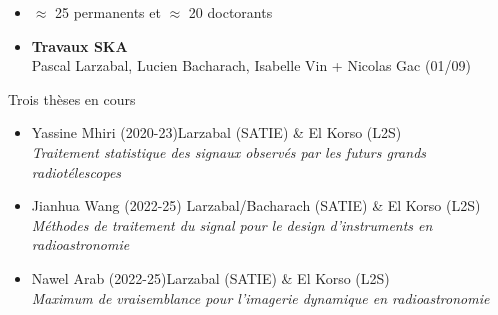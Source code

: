 \documentclass[usenames,dvipsnames]{beamer}
\begin{document}
\begin{frame}
  \vfill
  \begin{block}{}
    \begin{itemize}
  \item  \(\approx \) 25 permanents et \(\approx\) 20 doctorants
  \item \textbf{Travaux SKA} \\
 \vspace{0.1cm}
  Pascal Larzabal, Lucien Bacharach, Isabelle Vin + Nicolas Gac \scriptsize{(01/09)}
\end{itemize}
  \end{block}
  \vfill

  \begin{block}{Trois thèses en cours}
    \begin{itemize}
     \item \normalsize{Yassine Mhiri (2020-23)}\hfill \scriptsize{Larzabal (SATIE) \& El Korso (L2S)} \\
    \small{\textit{Traitement statistique des signaux observés par les futurs grands radiotélescopes}}\\
    \item \normalsize{Jianhua Wang (2022-25)} \hfill \scriptsize{Larzabal/Bacharach (SATIE) \& El Korso (L2S) } \\
    \small{\textit{Méthodes de traitement du signal pour le design d'instruments en radioastronomie}}\\
    \item \normalsize{Nawel Arab (2022-25)}\hfill \scriptsize{Larzabal (SATIE) \& El Korso (L2S)} \\
    \small{\textit{Maximum de vraisemblance pour l’imagerie dynamique en radioastronomie}}\\
    \end{itemize}
  \end{block}
  
\end{frame}

\end{document}
